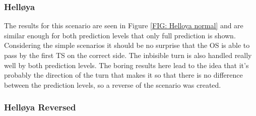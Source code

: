 \subsubsection{Helløya}
The results for this scenario are seen in Figure \ref{FIG: Helloya normal} and are similar enough for both prediction levels that only
full prediction is shown. Considering the simple scenarios it should be no surprise that the OS is able to pass by the first TS on the correct side.
The inbisible turn is also handled really well by both prediction levels. The boring results here lead to the idea that it's probably the direction
of the turn that makes it so that there is no difference between the prediction levels, so a reverse of the scenario was created.

\subsubsection{Helløya Reversed}

